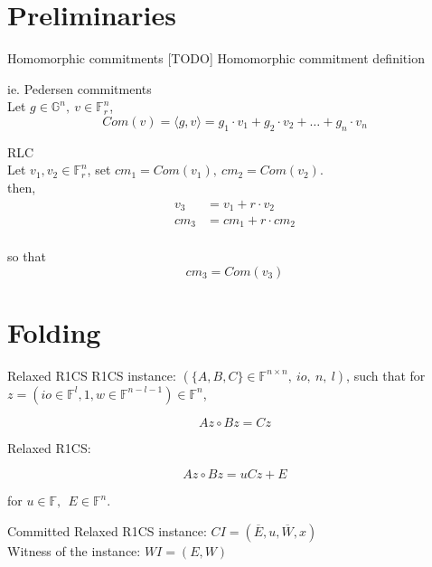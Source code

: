 \documentclass[t]{beamer}
\begin{document}
\section[Preliminaries]{Preliminaries}
\begin{frame}{Homomorphic commitments}
  [TODO] Homomorphic commitment definition

  ie. Pedersen commitments\\
  Let $g \in \mathbb{G}^n,~ v \in \mathbb{F}_r^n$,\\
  $$Com(v) = \langle g, v \rangle =g_1 \cdot v_1 + g_2 \cdot v_2 + \ldots + g_n \cdot v_n$$


  RLC\\
  Let $v_1, v_2 \in \mathbb{F}_r^n$, set $cm_1 = Com(v_1),~ cm_2=Com(v_2)$.
  \\then,
  \begin{align*}
    v_3 &= v_1 + r \cdot v_2\\
    cm_3 &=cm_1 + r \cdot cm_2
  \end{align*}
  \\so that
  $$cm_3 = Com(v_3)$$

\end{frame}

\section[Folding]{Folding}
\begin{frame}{Relaxed R1CS}
  R1CS instance: $(\{A, B, C\} \in \mathbb{F}^{n \times n},~ io,~ n,~ l)$, such that for $z=(io \in \mathbb{F}^l, 1, w \in \mathbb{F}^{n-l-1}) \in \mathbb{F}^n$,

$$Az \circ Bz = Cz$$


Relaxed R1CS:

$$Az \circ Bz = uCz + E$$

for $u \in \mathbb{F},~~ E \in \mathbb{F}^n$.

\vspace{1cm}

Committed Relaxed R1CS instance: $CI = (\overline{E}, u, \overline{W}, x)$\\
Witness of the instance: $WI=(E, W)$


\end{frame}
\end{document}
